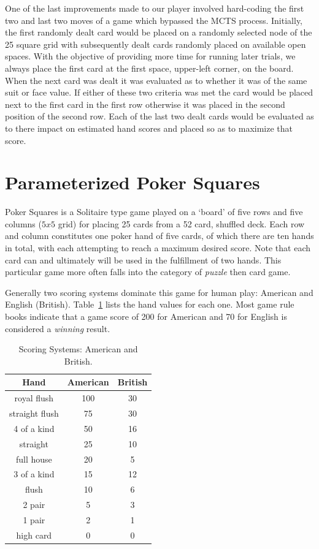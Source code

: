\documentclass[letterpaper]{article}
\begin{document}
One of the last improvements made to our player involved hard-coding the first two and last two moves of a game which bypassed the MCTS process. Initially, the first randomly dealt card would be placed on a randomly selected node of the 25 square grid with subsequently dealt cards randomly placed on available open spaces. With the objective of providing more time for running later trials, we always place the first card at the first space, upper-left corner, on the board. When the next card was dealt it was evaluated as to whether it was of the same suit or face value. If either of these two criteria was met the card would be placed next to the first card in the first row otherwise it was placed in the second position of the second row. Each of the last two dealt cards would be evaluated as to there impact on estimated hand scores and placed so as to maximize that score.

\section{Parameterized Poker Squares}

Poker Squares is a Solitaire type game played on a `board' of five rows and five columns ($5 x 5$ grid) for placing 25 cards from a 52 card, shuffled deck. Each row and column constitutes one poker hand of five cards, of which there are ten hands in total, with each attempting to reach a maximum desired score. Note that each card can and ultimately will be used in the fulfillment of two hands. This particular game more often falls into the category of  \emph{puzzle} then card game.

Generally two scoring systems dominate this game for human play: American and English (British). Table~\ref{tbl:SSAMBR} lists the hand values for each one. Most game rule books indicate that a game score of 200 for American and 70 for English is considered a \emph{winning} result.

\begin{table}[b]
\caption{Scoring Systems: American and British.}
\label{tbl:SSAMBR}
\centering
\begin{tabular}{c c c}
\hline
Hand & American & British \\
\hline
royal flush & 100 & 30 \\
straight flush & 75 & 30 \\
4 of a kind & 50 & 16 \\
straight & 25 & 10 \\
full house & 20 & 5 \\
3 of a kind & 15 & 12 \\
flush & 10 & 6 \\
2 pair & 5 & 3 \\
1 pair & 2 & 1 \\
high card & 0 & 0 \\
\hline
\end{tabular}
\end{table}
\end{document}

